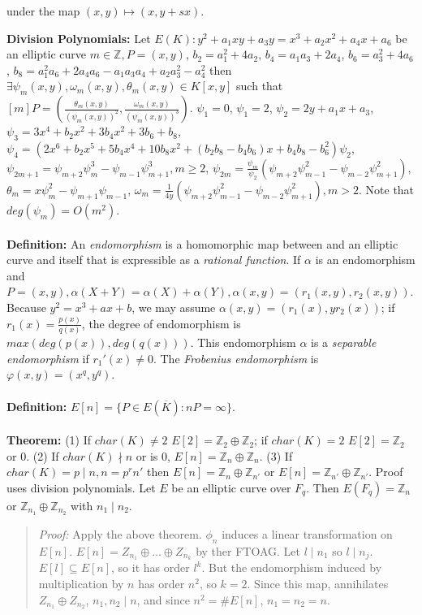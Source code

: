 under the map $(x,y) \mapsto (x, y+sx)$.
\begin{quote}
\end{quote}
{\bf Division Polynomials:}
Let $E(K): y^2+a_1xy+a_3y= x^3 +a_2 x^2 + a_4 x + a_6$ be an elliptic curve 
$m \in {\mathbb Z}, P = (x,y)$, 
$b_2 = a_1^2 + 4a_2$,
$b_4 = a_1 a_3 + 2a_4$,
$b_6 = a_3^2 + 4a_6$,
$b_8 =  a_1^2 a_6 + 2 a_4 a_6 - a_1 a_3 a_4 + a_2 a_3^2 -a_4^2$ then
$\exists \psi_m(x,y), \omega_m(x,y), \theta_m(x,y) \in K[x,y]$ such that
$[m]P=({\frac {\theta_m(x,y)} {(\psi_m(x,y))^2}}, {\frac {\omega_m(x,y)} {(\psi_m(x,y))^3}})$.
$\psi_1 = 0$, $\psi_1 = 2$,
$\psi_2 = 2y+a_1x+a_3$, 
$\psi_3 = 3x^4+b_2x^2+3b_4x^2+3b_6+b_8$,
$\psi_4 = (2x^6+b_2x^5+5 b_4 x^4 + 10 b_8 x^2 +(b_2 b_8-b_4 b_6)x+ b_4 b_8 - b_6^2) 
\psi_2$,
$\psi_{2m+1} = \psi_{m+2} \psi_m^3 - \psi_{m-1}\psi_{m+1}^3, m \ge 2$,
$\psi_{2m} = 
{\frac {\psi_m} {\psi_2}}
(\psi_{m+2} \psi_{m-1}^2 - \psi_{m-2} \psi_{m+1}^2)$,
$\theta_m = x \psi_m^2- \psi_{m+1} \psi_{m-1}$,
$\omega_m = 
{\frac {1} {4 y}} 
(\psi_{m+2} \psi_{m-1}^2- \psi_{m-2} \psi_{m+1}^2), m>2$.
Note that $deg(\psi_m)= O(m^2)$.
\\
\\
{\bf Definition:}
An \emph{endomorphism} is a homomorphic map between and an elliptic 
curve and itself that is expressible as a \emph{rational function}.
If $\alpha$ is an endomorphism and $P=(x,y),
\alpha(X+Y) = \alpha(X) + \alpha(Y), \alpha(x,y)= (r_1(x,y), r_2(x,y))$.  Because
$y^2= x^3+ax+b$, we may assume 
$\alpha(x,y)= (r_1(x), y r_2(x))$; if $r_1(x)= {\frac {p(x)} {q(x)}}$, the degree of
endomorphism is $max(deg(p(x)), deg(q(x)))$.  This endomorphism
$\alpha$ is a \emph{separable endomorphism} if $r_1'(x) \ne 0$.
The \emph{Frobenius endomorphism} is
$\varphi(x,y)= (x^q , y^q)$. 
\\
\\
{\bf Definition:}
$E[n]= \{P \in E({\overline K}): nP= \infty \}$.
\\
\\
{\bf Theorem:} (1) If $char(K) \ne 2$ $E[2]= {\mathbb Z}_2 \oplus {\mathbb Z}_2$; 
if $char(K) = 2$ $E[2]= {\mathbb Z}_2$ or $0$.
(2) If $char(K) \nmid n$ or is $0$, $E[n]= {\mathbb Z}_n \oplus {\mathbb Z}_n$.  (3)
If $char(K)=p \mid n, n=p^r n'$ then
$E[n]= {\mathbb Z}_n \oplus {\mathbb Z}_{n'}$ or
$E[n]= {\mathbb Z}_{n'} \oplus {\mathbb Z}_{n'}$.  Proof
uses division polynomials.  Let
$E$ be an elliptic curve over $F_q$.  Then 
$E(F_q)= {\mathbb Z}_n$ or
${\mathbb Z}_{n_1} \oplus {\mathbb Z}_{n_2}$ with $n_1 \mid n_2$.  
\begin{quote}
\emph{Proof:}
Apply the above theorem.
$\phi_n$ induces a linear transformation on $E[n]$.
$E[n]= Z_{n_1} \oplus \ldots \oplus Z_{n_k}$ by ther FTOAG.  Let $l \mid n_1$ so
$l \mid n_j$. $E[l] \subseteq E[n]$, so it has order $l^k$.  But the 
endomorphism induced by multiplication by $n$ has order $n^2$, so $k=2$.  Since
this map, annihilates $Z_{n_1} \oplus Z_{n_2}$, $n_1, n_2 \mid n$, and since
$n^2= \#E[n]$, $n_1=n_2=n$.
\end{quote}
